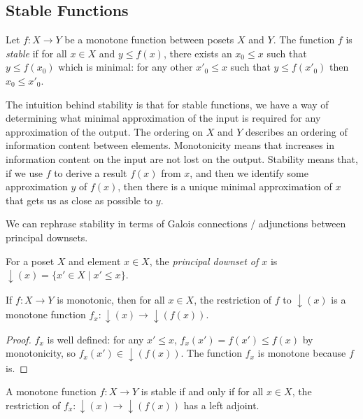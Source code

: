 \subsection{Stable Functions}
\label{sec:stable-functions}

\begin{definition}
  Let $f : X \to Y$ be a monotone function between posets $X$ and
  $Y$. The function $f$ is \emph{stable} if for all $x \in X$ and
  $y \leq f(x)$, there exists an $x_0 \leq x$ such that $y \leq f(x_0)$ which
  is minimal: for any other $x'_0 \leq x$ such that $y \leq f(x'_0)$ then
  $x_0 \leq x'_0$.
\end{definition}

The intuition behind stability is that for stable functions, we have a
way of determining what minimal approximation of the input is required
for any approximation of the output. The ordering on $X$ and $Y$
describes an ordering of information content between
elements. Monotonicity means that increases in information content on
the input are not lost on the output. Stability means that, if we use
$f$ to derive a result $f(x)$ from $x$, and then we identify some
approximation $y$ of $f(x)$, then there is a unique minimal
approximation of $x$ that gets us as close as possible to $y$.

We can rephrase stability in terms of Galois connections / adjunctions
between principal downsets.

\newcommand{\downset}[1]{\mathop{\downarrow}(#1)}

\begin{definition}
  For a poset $X$ and element $x \in X$, the \emph{principal
    downset of $x$} is $\downset{x} = \{ x' \in X \mid x' \leq x \}$.
\end{definition}

\begin{lemma}
  If $f : X \to Y$ is monotonic, then for all $x \in X$, the
  restriction of $f$ to $\downset{x}$ is a monotone function
  $f_x : \downset{x} \to \downset{f(x)}$.
\end{lemma}

\begin{proof}
  $f_x$ is well defined: for any $x' \leq x$,
  $f_x(x') = f(x') \leq f(x)$ by monotonicity, so
  $f_x(x') \in \downset{f(x)}$. The function $f_x$ is monotone because
  $f$ is.
\end{proof}

\begin{lemma}
  A monotone function $f : X \to Y$ is stable if and only if for all
  $x \in X$, the restriction of $f_x : \downset{x} \to \downset{f(x)}$
  has a left adjoint.
\end{lemma}

